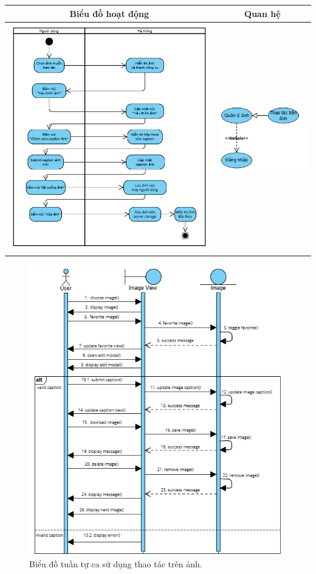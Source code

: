 \vspace{0.8cm}

\noindent 
\begin{tabular}{| c | c |}
    \hline
    \textbf{Biểu đồ hoạt động} & \textbf{Quan hệ} \\ 
    \hline
    \includegraphics[width=0.6\linewidth]{figures/c3/3-3-6-activity-diagram.png} 
    &  
    \includegraphics[width=0.35\linewidth]{figures/c3/3-3-6-relationship.png} \\ 
    \hline
\end{tabular}

\begin{figure}[H]
    \centering  
    \includegraphics[width=1.1\textwidth]{figures/c3/3-3-6-sequence-diagram.png}
    \caption{Biểu đồ tuần tự ca sử dụng thao tác trên ảnh.}
    \label{fig:3-3-6-sequence-diagram}
\end{figure}
